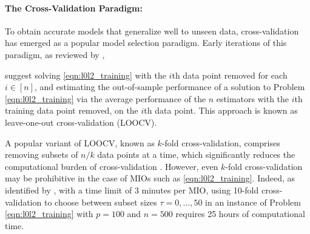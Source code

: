\documentclass[mnsc,nonblindrev]{informs3} %
\begin{document}
\paragraph{The Cross-Validation Paradigm: }
To obtain accurate models that generalize well to unseen data, cross-validation has emerged as a popular model selection paradigm. {\color{black}Early iterations of this paradigm, as reviewed by} \citet{stone1978cross}, {\color{black}suggest solving \eqref{eqn:l0l2_training} with the $i$th data point removed for each $i \in [n]$, and estimating the out-of-sample performance of a solution to Problem \eqref{eqn:l0l2_training} via the average performance of the $n$ estimators with the $i$th training data point removed, on the $i$th data point. This approach is known as leave-one-out cross-validation (LOOCV). 

A popular variant of LOOCV, known as $k$-fold cross-validation, comprises removing subsets of $n/k$ data points at a time, which significantly reduces the computational burden of cross-validation \citep{burman1989comparative, arlot2010survey}. However, even $k$-fold cross-validation may be prohibitive in the case of MIOs such as \eqref{eqn:l0l2_training}. Indeed, as identified by \cite{hastie2020best}, with a time limit of 3 minutes per MIO, using 10-fold cross-validation to choose between subset sizes $\tau=0,\dots,50$ in an instance of Problem \eqref{eqn:l0l2_training} with $p=100$ and $n=500$ requires 25 hours of computational time.}  %
\end{document}
